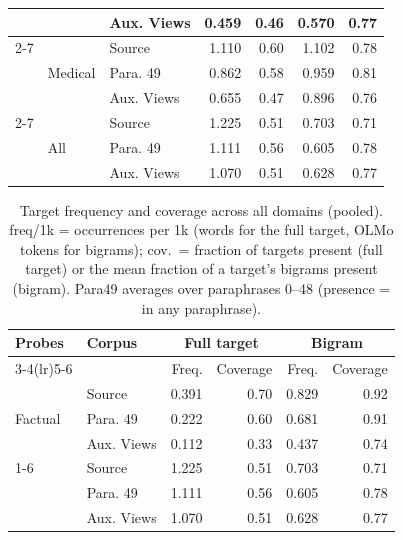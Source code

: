 \begin{table}[t]
\begin{tabular}{lllrrrr}
 &  & Aux. Views & 0.459 & 0.46 & 0.570 & 0.77 \\
\cmidrule(lr){2-7}
 & \multirow{3}{*}{Medical} & Source & 1.110 & 0.60 & 1.102 & 0.78 \\
 &  & Para. 49 & 0.862 & 0.58 & 0.959 & 0.81 \\
 &  & Aux. Views & 0.655 & 0.47 & 0.896 & 0.76 \\
\cmidrule(lr){2-7}
 & \multirow{3}{*}{All} & Source & 1.225 & 0.51 & 0.703 & 0.71 \\
 &  & Para. 49 & 1.111 & 0.56 & 0.605 & 0.78 \\
 &  & Aux. Views & 1.070 & 0.51 & 0.628 & 0.77 \\
\bottomrule
\end{tabular}
\end{table}

\begin{table}[t]
\centering
\small
\setlength{\tabcolsep}{4pt}
\renewcommand{\arraystretch}{0.9}
\caption{Target frequency and coverage across all domains (pooled). freq/1k = occurrences per 1k (words for the full target, OLMo tokens for bigrams); cov.\ = fraction of targets present (full target) or the mean fraction of a target's bigrams present (bigram). Para49 averages over paraphrases 0--48 (presence = in any paraphrase).}
\label{tab:target-occurrence-all}
\begin{tabular}{llrrrr}
\toprule
Probes & Corpus & \multicolumn{2}{c}{Full target} & \multicolumn{2}{c}{Bigram} \\
\cmidrule(lr){3-4}\cmidrule(lr){5-6}
 & & Freq. & Coverage & Freq. & Coverage \\
\midrule
\multirow{3}{*}{Factual} & Source & 0.391 & 0.70 & 0.829 & 0.92 \\
 & Para. 49 & 0.222 & 0.60 & 0.681 & 0.91 \\
 & Aux. Views & 0.112 & 0.33 & 0.437 & 0.74 \\
\cmidrule(lr){1-6}
\multirow{3}{*}{Inference} & Source & 1.225 & 0.51 & 0.703 & 0.71 \\
 & Para. 49 & 1.111 & 0.56 & 0.605 & 0.78 \\
 & Aux. Views & 1.070 & 0.51 & 0.628 & 0.77 \\
\bottomrule
\end{tabular}
\end{table}

